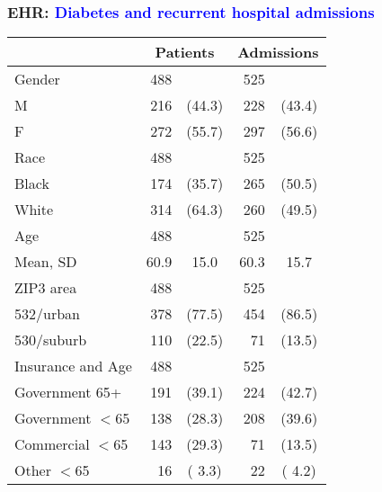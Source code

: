 \documentclass[11pt,pdftex,dvipsnames,usenames,helvetica]{beamer}
\begin{document}
\begin{frame}\frametitle{EHR:
\textcolor{blue}{Diabetes and recurrent hospital admissions}}
\begin{center}
\begin{tabular}{lrcrc}\hline
&\multicolumn{2}{c}{Patients}&\multicolumn{2}{c}{Admissions}\\ \hline
Gender              &488&                       &525\\
  M                 &216& (44.3)                &228& (43.4)\\
  F                 &272& (55.7)                &297& (56.6)\\ \hline
Race                &488&                       &525\\
  Black             &174& (35.7)                &265& (50.5)\\
  White             &314& (64.3)                &260& (49.5)\\ \hline
Age                 &488&                       &525\\
  Mean, SD         & 60.9&15.0                & 60.3&15.7\\ \hline
ZIP3 area           &488&                       &525\\
  532/urban         &378& (77.5)                &454& (86.5)\\
  530/suburb        &110& (22.5)                & 71& (13.5)\\ \hline
Insurance and Age          &488&                       &525\\
  Government 65+    &191& (39.1)                &224& (42.7)\\
  Government $<$65  &138& (28.3)                &208& (39.6)\\
  Commercial $<$65  &143& (29.3)                & 71& (13.5)\\
  Other $<$65       & 16& ( 3.3)                & 22& ( 4.2)\\ \hline
\end{tabular}
\end{center}
\end{frame}
\end{document}

